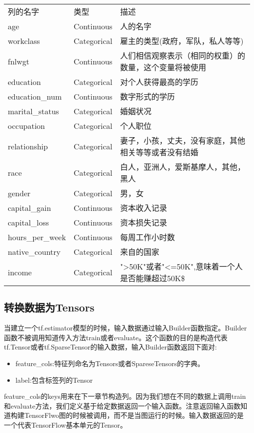 \begin{tabular}{ |p{1cm}||p{1cm}|p{8cm}|}
列的名字&类型&描述\\
age&Continuous&人的名字\\
workclass&  Categorical&雇主的类型(政府，军队，私人等等)\\
fnlwgt& Continuous& 人们相信观察表示（相同的权重）的数量，这个变量将被使用\\
education&  Categorical&对个人获得最高的学历\\
education\_num& Continuous& 数字形式的学历\\
marital\_status&  Categorical&婚姻状况\\
occupation& Categorical&个人职位\\
relationship& Categorical &妻子，小孩，丈夫，没有家庭，其他相关等等或者没有结婚\\
race& Categorical&白人，亚洲人，爱斯基摩人，其他，黑人\\
gender& Categorical&男，女\\
capital\_gain&  Continuous& 资本收入记录\\
capital\_loss&  Continuous& 资本损失记录\\
hours\_per\_week& Continuous& 每周工作小时数\\
native\_country&  Categorical&  来自的国家\\
income& Categorical&">50K"或者"<=50K",意味着一个人是否能赚超过50K\$
\end{tabular}
\subsection{转换数据为Tensors}
当建立一个tf.estimator模型的时候，输入数据通过输入Builder函数指定。Builder函数不被调用知道传入方法train或者evaluate。这个函数的目的是构造代表tf.Tensor或者tf.SparseTensor的输入数据，输入Builder函数返回下面对:
\begin{itemize}
  \item feature\_cols:特征列命名为Tensors或者SpareseTensors的字典。
  \item label:包含标签列的Tensor
\end{itemize}
feature\_cols的keys用来在下一章节构造列。因为我们想在不同的数据上调用train和evaluate方法，我们定义基于给定数据返回一个输入函数。注意返回输入函数知道构建TensorFlwo图的时候被调用，而不是当图运行的时候。输入数据返回的是一个代表TensorFlow基本单元的Tensor。

